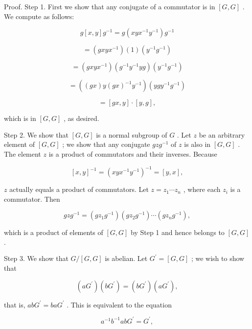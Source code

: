 Proof. Step 1. First we show that any conjugate of a commutator is in \(\left\lbrack  {G,G}\right\rbrack\) . We compute as follows:

\[
g\left\lbrack  {x,y}\right\rbrack  {g}^{-1} = g\left( {{xy}{x}^{-1}{y}^{-1}}\right) {g}^{-1}
\]

\[
= \left( {{gxy}{x}^{-1}}\right) \left( 1\right) \left( {{y}^{-1}{g}^{-1}}\right)
\]

\[
= \left( {{gxy}{x}^{-1}}\right) \left( {{g}^{-1}{y}^{-1}{yg}}\right) \left( {{y}^{-1}{g}^{-1}}\right)
\]

\[
= \left( {\left( {gx}\right) y{\left( gx\right) }^{-1}{y}^{-1}}\right) \left( {{yg}{y}^{-1}{g}^{-1}}\right)
\]

\[
= \left\lbrack  {{gx},y}\right\rbrack   \cdot  \left\lbrack  {y,g}\right\rbrack  ,
\]

which is in \(\left\lbrack  {G,G}\right\rbrack\) , as desired.

Step 2. We show that \(\left\lbrack  {G,G}\right\rbrack\) is a normal subgroup of \(G\) . Let \(z\) be an arbitrary element of \(\left\lbrack  {G,G}\right\rbrack\) ; we show that any conjugate \({gz}{g}^{-1}\) of \(z\) is also in \(\left\lbrack  {G,G}\right\rbrack\) . The element \(z\) is a product of commutators and their inverses. Because

\[
{\left\lbrack  x,y\right\rbrack  }^{-1} = {\left( xy{x}^{-1}{y}^{-1}\right) }^{-1} = \left\lbrack  {y,x}\right\rbrack  ,
\]

\(z\) actually equals a product of commutators. Let \(z = {z}_{1}\cdots {z}_{n}\) , where each \({z}_{i}\) is a commutator. Then

\[
{gz}{g}^{-1} = \left( {g{z}_{1}{g}^{-1}}\right) \left( {g{z}_{2}{g}^{-1}}\right) \cdots \left( {g{z}_{n}{g}^{-1}}\right) ,
\]

which is a product of elements of \(\left\lbrack  {G,G}\right\rbrack\) by Step 1 and hence belongs to \(\left\lbrack  {G,G}\right\rbrack\) .

Step 3. We show that \(G/\left\lbrack  {G,G}\right\rbrack\) is abelian. Let \({G}^{\prime } = \left\lbrack  {G,G}\right\rbrack\) ; we wish to show that

\[
\left( {a{G}^{\prime }}\right) \left( {b{G}^{\prime }}\right)  = \left( {b{G}^{\prime }}\right) \left( {a{G}^{\prime }}\right) ,
\]

that is, \({ab}{G}^{\prime } = {ba}{G}^{\prime }\) . This is equivalent to the equation

\[
{a}^{-1}{b}^{-1}{ab}{G}^{\prime } = {G}^{\prime },
\]

